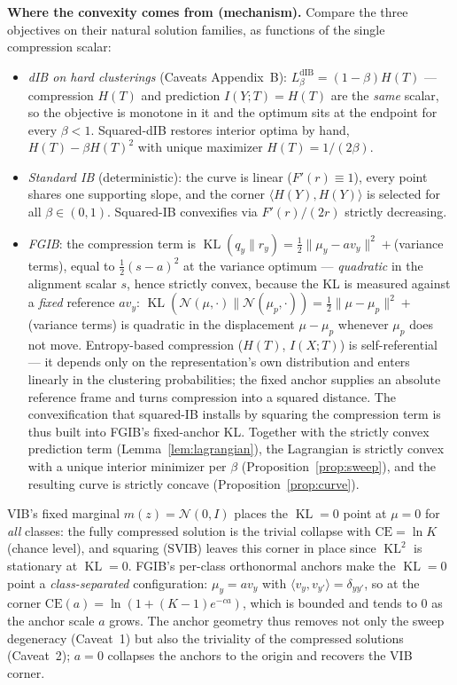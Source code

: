 \textbf{Where the convexity comes from (mechanism).}
Compare the three objectives on their natural solution families, as functions of the
single compression scalar:
\begin{itemize}
\item \emph{dIB on hard clusterings} (Caveats Appendix~B): $L^{\mathrm{dIB}}_\beta
= (1-\beta)H(T)$ --- compression $H(T)$ and prediction $I(Y;T) = H(T)$ are the
\emph{same} scalar, so the objective is monotone in it and the optimum sits at the
endpoint for every $\beta < 1$. Squared-dIB restores interior optima by hand,
$H(T) - \beta H(T)^2$ with unique maximizer $H(T) = 1/(2\beta)$.
\item \emph{Standard IB} (deterministic): the curve is linear ($F'(r) \equiv 1$), every
point shares one supporting slope, and the corner $\langle H(Y), H(Y)\rangle$ is
selected for all $\beta \in (0,1)$. Squared-IB convexifies via $F'(r)/(2r)$ strictly
decreasing.
\item \emph{FGIB}: the compression term is $\operatorname{KL}(q_y \| r_y) =
\tfrac{1}{2}\|\mu_y - a v_y\|^2 + {}$(variance terms), equal to $\tfrac{1}{2}(s-a)^2$
at the variance optimum --- \emph{quadratic} in the alignment scalar $s$, hence strictly
convex, because the KL is measured against a \emph{fixed} reference $a v_y$:
$\operatorname{KL}(\mathcal{N}(\mu,\cdot)\|\mathcal{N}(\mu_p,\cdot))
= \tfrac{1}{2}\|\mu - \mu_p\|^2 + {}$(variance terms) is quadratic in the displacement
$\mu - \mu_p$ whenever $\mu_p$ does not move. Entropy-based compression ($H(T)$,
$I(X;T)$) is self-referential --- it depends only on the representation's own
distribution and enters linearly in the clustering probabilities; the fixed anchor
supplies an absolute reference frame and turns compression into a squared distance. The
convexification that squared-IB installs by squaring the compression term is thus built
into FGIB's fixed-anchor KL. Together with the strictly convex prediction term
(Lemma~\ref{lem:lagrangian}), the Lagrangian is strictly convex with a unique interior
minimizer per $\beta$ (Proposition~\ref{prop:sweep}), and the resulting curve is
strictly concave (Proposition~\ref{prop:curve}).
\end{itemize}

\begin{remark}\label{rem:endpoint}
VIB's fixed marginal $m(z) = \mathcal{N}(0, I)$ places the $\operatorname{KL}=0$ point
at $\mu = 0$ for \emph{all} classes: the fully compressed solution is the trivial
collapse with $\mathrm{CE} = \ln K$ (chance level), and squaring (SVIB) leaves this
corner in place since $\operatorname{KL}^2$ is stationary at $\operatorname{KL}=0$.
FGIB's per-class orthonormal anchors make the $\operatorname{KL}=0$ point a
\emph{class-separated} configuration: $\mu_y = a v_y$ with
$\langle v_y, v_{y'}\rangle = \delta_{yy'}$, so at the corner
$\mathrm{CE}(a) = \ln(1 + (K-1)e^{-ca})$, which is bounded and tends to $0$ as the
anchor scale $a$ grows. The anchor geometry thus removes not only the sweep degeneracy
(Caveat~1) but also the triviality of the compressed solutions (Caveat~2); $a = 0$
collapses the anchors to the origin and recovers the VIB corner.
\end{remark}

